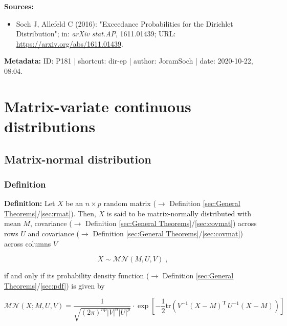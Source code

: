 \documentclass[a4paper,12pt,twoside]{book}
\begin{document}
\vspace{1em}
\textbf{Sources:}
\begin{itemize}
\item Soch J, Allefeld C (2016): "Exceedance Probabilities for the Dirichlet Distribution"; in: \textit{arXiv stat.AP}, 1611.01439; URL: \url{https://arxiv.org/abs/1611.01439}.
\end{itemize}


\vspace{1em}
\textbf{Metadata:} ID: P181 | shortcut: dir-ep | author: JoramSoch | date: 2020-10-22, 08:04.
\vspace{1em}



\pagebreak
\section{Matrix-variate continuous distributions}

\subsection{Matrix-normal distribution}

\subsubsection[\textit{Definition}]{Definition} \label{sec:matn}
\setcounter{equation}{0}

\textbf{Definition:} Let $X$ be an $n \times p$ random matrix ($\rightarrow$ Definition \ref{sec:General Theorems}/\ref{sec:rmat}). Then, $X$ is said to be matrix-normally distributed with mean $M$, covariance ($\rightarrow$ Definition \ref{sec:General Theorems}/\ref{sec:covmat}) across rows $U$ and covariance ($\rightarrow$ Definition \ref{sec:General Theorems}/\ref{sec:covmat}) across columns $V$

\begin{equation} \label{eq:matn-matn}
X \sim \mathcal{MN}(M, U, V) \; ,
\end{equation}

if and only if its probability density function ($\rightarrow$ Definition \ref{sec:General Theorems}/\ref{sec:pdf}) is given by

\begin{equation} \label{eq:matn-matn-pdf}
\mathcal{MN}(X; M, U, V) = \frac{1}{\sqrt{(2\pi)^{np} |V|^n |U|^p}} \cdot \exp\left[-\frac{1}{2} \mathrm{tr}\left( V^{-1} (X-M)^\mathrm{T} \, U^{-1} (X-M) \right) \right]
\end{equation}
\end{document}
